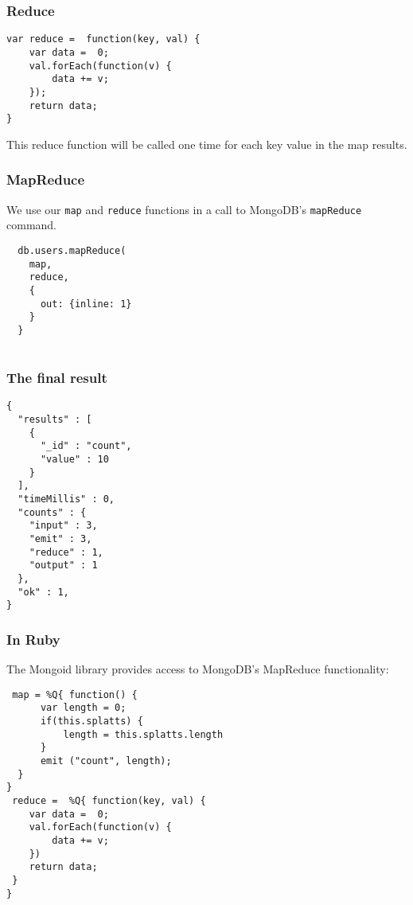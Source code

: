 \documentclass[10pt]{beamer}
\begin{document}
\begin{frame}[fragile]
  \frametitle{Reduce}

 \begin{verbatim}
var reduce =  function(key, val) {
    var data =  0;
    val.forEach(function(v) {
        data += v;
    });
    return data;
}
 \end{verbatim}

This reduce function will be called one time for each key value in the map results.
\end{frame}



\begin{frame}[fragile]
  \frametitle{MapReduce}

 We use our \texttt{map} and \texttt{reduce} functions in a call to MongoDB's 
 \texttt{mapReduce} command.
 \begin{verbatim}
  db.users.mapReduce(
    map,
    reduce,
    {
      out: {inline: 1}
    }
  }


 \end{verbatim}

\end{frame}


\begin{frame}[fragile]
  \frametitle{The final result}

 \begin{verbatim}
{
  "results" : [
    {
      "_id" : "count",
      "value" : 10
    }
  ],
  "timeMillis" : 0,
  "counts" : {
    "input" : 3,
    "emit" : 3,
    "reduce" : 1,
    "output" : 1
  },
  "ok" : 1,
}

 \end{verbatim}

\end{frame}


\begin{frame}[fragile]
  \frametitle{In Ruby}

 The Mongoid library provides access to MongoDB's MapReduce functionality:

 \begin{verbatim}
 map = %Q{ function() { 
      var length = 0;
      if(this.splatts) {
          length = this.splatts.length
      }
      emit ("count", length); 
  } 
}
 reduce =  %Q{ function(key, val) {
    var data =  0;
    val.forEach(function(v) {
        data += v;
    })
    return data;
 }
}
 \end{verbatim}

\end{frame}
\end{document}
